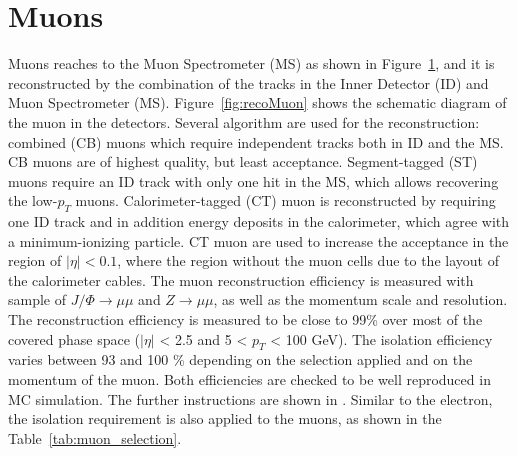 \section{Muons}
Muons reaches to the Muon Spectrometer (MS) as shown in Figure~\ref{}, and it is reconstructed by the combination of the tracks in the Inner Detector (ID) and Muon Spectrometer (MS). 
Figure~\ref{fig:recoMuon} shows the schematic diagram of the muon in the detectors.
Several algorithm are used for the reconstruction: 
combined (CB) muons which require independent tracks both in ID and the MS. CB muons are of highest quality, but least acceptance. 
Segment-tagged (ST) muons require an ID track with only one hit in the MS, which allows recovering the low-$p_T$ muons. 
Calorimeter-tagged (CT) muon is reconstructed by requiring one ID track and in addition energy deposits in the calorimeter, which agree with a minimum-ionizing particle. CT muon are used to increase the acceptance in the region of $|\eta| < 0.1$, where the region without the muon cells due to the layout of the calorimeter cables. 
The muon reconstruction efficiency is measured with sample of $J/\Phi \rightarrow \mu\mu$ and $Z\rightarrow \mu\mu$, as well as the momentum scale and resolution.
The reconstruction efficiency is measured to be close to 99\% over most of the covered phase space ($|\eta|$ < 2.5 and 5 < $p_{T}$ < 100 GeV). The isolation efficiency varies between 93 and 100 \% depending on the selection applied and on the momentum of the muon. Both efficiencies are checked to be well reproduced in MC simulation. 
The further instructions are shown in \cite{MUON-2018-03}.
Similar to the electron, the isolation requirement is also applied to the muons, as shown in the Table~\ref{tab:muon_selection}.
